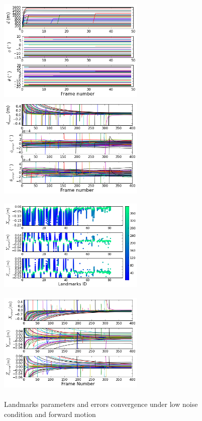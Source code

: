 \begin{figure}[h]
\centering
\includegraphics[width=7cm, height=5cm]{./Figures/SimulationFigures/Figure6.png}
\includegraphics[width=7cm, height=5cm]{./Figures/SimulationFigures/Figure7.png}
\includegraphics[width=7cm, height=5cm]{./Figures/SimulationFigures/Figure5.png}
\includegraphics[width=7cm, height=5cm]{./Figures/SimulationFigures/Figure8.png}
\caption{Landmarks parameters and errors convergence under low noise
  condition and forward motion}
\label{fig:simfig5-8}
\end{figure}

